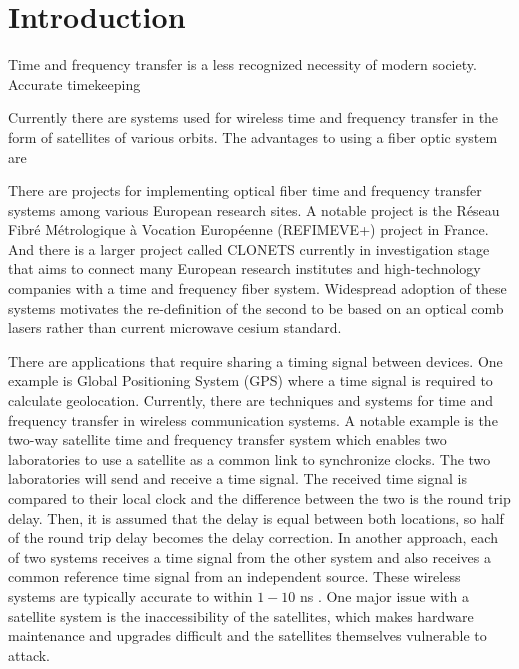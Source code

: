 \section{Introduction}

Time and frequency transfer is a less recognized necessity of modern society. Accurate timekeeping

Currently there are systems used for wireless time and frequency transfer in the form of satellites of various orbits. The advantages to using a fiber optic system are

There are projects for implementing optical fiber time and frequency transfer systems among various European research sites.  A notable project is the R\'eseau Fibr\'e M\'etrologique \`a Vocation Europ\'eenne (REFIMEVE+) project in France. And there is a larger project called CLONETS currently in investigation stage that aims to connect many European research institutes and high-technology companies with a time and frequency fiber system.  Widespread adoption of these systems motivates the re-definition of the second to be based on an optical comb lasers rather than current microwave cesium standard.














There are applications that require sharing a timing signal between devices.  One example is Global Positioning System (GPS) where a time signal is required to calculate geolocation.  Currently, there are techniques and systems for time and frequency transfer in wireless communication systems.  A notable example is the two-way satellite time and frequency transfer system which enables two laboratories to use a satellite as a common link to synchronize clocks.  The two laboratories will send and receive a time signal.  The received time signal is compared to their local clock and the difference between the two is the round trip delay.  Then, it is assumed that the delay is equal between both locations, so half of the round trip delay becomes the delay correction.  In another approach, each of two systems receives a time signal from the other system and also receives a common reference time signal from an independent source.  These wireless systems are typically accurate to within $1-10$ ns \cite{Allan1980}.  One major issue with a satellite system is the inaccessibility of the satellites, which makes hardware maintenance and upgrades difficult and the satellites themselves vulnerable to attack.  

